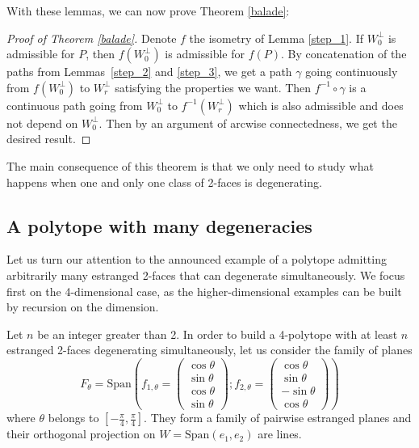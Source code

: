 \documentclass[12pt, notitlepage]{article}
\theoremstyle{plain}
\theoremstyle{definition}
\theoremstyle{plain}
\theoremstyle{remark}
\theoremstyle{plain}
\theoremstyle{plain}
\newcommand{\vect}{\text{Span}}
\begin{document}
With these lemmas, we can now prove Theorem \ref{balade}:

\begin{proof}[Proof of Theorem \ref{balade}]
    Denote $f$ the isometry of Lemma \ref{step_1}. If $W_0^\perp$ is admissible for $P$, then $f(W_0^\perp)$ is admissible for $f(P)$. By concatenation of the paths from Lemmas~\ref{step_2} and \ref{step_3}, we get a path $\gamma$ going continuously from $f(W_0^\perp)$ to $W_r^\perp$ satisfying the properties we want. Then $f^{-1}\circ\gamma$ is a continuous path going from $W_0^\perp$ to $f^{-1}(W_r^\perp)$ which is also admissible and does not depend on $W_0^\perp$. Then by an argument of arcwise connectedness, we get the desired result.
\end{proof}

The main consequence of this theorem is that we only need to study what happens when one and only one class of 2-faces is degenerating.

\subsection{A polytope with many degeneracies}

Let us turn our attention to the announced example of a polytope admitting arbitrarily many estranged 2-faces that can degenerate simultaneously. We focus first on the 4-dimensional case, as the higher-dimensional examples can be built by recursion on the dimension.

Let $n$ be an integer greater than 2. In order to build a 4-polytope with at least $n$ estranged 2-faces degenerating simultaneously, let us consider the family of planes \[ F_\theta = \vect \left( f_{1,\theta} = \begin{pmatrix}
    \cos \theta \\ \sin \theta \\ \cos \theta \\ \sin \theta
\end{pmatrix} ;f_{2,\theta} = \begin{pmatrix}
    \cos \theta \\ \sin \theta \\ -\sin \theta \\ \cos \theta
\end{pmatrix} \right) \] where $\theta$ belongs to $\left[ -\frac{\pi}{4},\frac{\pi}{4} \right]$. They form a family of pairwise estranged planes and their orthogonal projection on $W = \vect(e_1,e_2)$ are lines.
\end{document}
